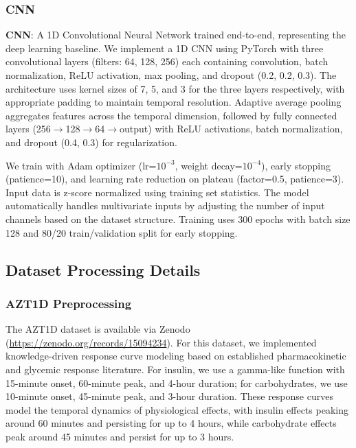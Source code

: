 \documentclass[times, review, 10pt]{elsarticle}
\begin{document}
\subsubsection{CNN}
\textbf{CNN}: A 1D Convolutional Neural Network trained end-to-end, representing the deep learning baseline.
We implement a 1D CNN using PyTorch with three convolutional layers (filters: 64, 128, 256) each containing convolution, batch normalization, ReLU
activation, max pooling, and dropout (0.2, 0.2, 0.3). The architecture uses kernel sizes of 7, 5, and 3 for the three layers
respectively, with appropriate padding to maintain temporal resolution. Adaptive average pooling aggregates features across the temporal dimension,
followed by fully connected layers (256$\rightarrow$128$\rightarrow$64$\rightarrow$output) with ReLU activations, batch normalization, and dropout (0.4, 0.3) for regularization.

We train with Adam optimizer (lr=$10^{-3}$, weight decay=$10^{-4}$), early stopping (patience=10), and learning rate reduction on plateau (factor=0.5, patience=3).
Input data is z-score normalized using training set statistics. The model automatically handles multivariate inputs by adjusting the number of input channels 
based on the dataset structure. Training uses 300 epochs with batch size 128 and 80/20 train/validation split for early stopping.

\subsection{Dataset Processing Details}
\label{sec:dataset_processing}

\subsubsection{AZT1D Preprocessing}

The AZT1D dataset is available via Zenodo (\url{https://zenodo.org/records/15094234}).
For this dataset, we implemented knowledge-driven response curve modeling based on established pharmacokinetic and glycemic response literature.
For insulin, we use a gamma-like function with 15-minute onset, 60-minute peak,
and 4-hour duration; for carbohydrates, we use 10-minute onset, 45-minute peak, and 3-hour duration.
These response curves model the temporal dynamics of physiological effects,
with insulin effects peaking around 60 minutes and persisting for up to 4
hours, while carbohydrate effects peak around 45 minutes and persist for up to
3 hours.
\end{document}
